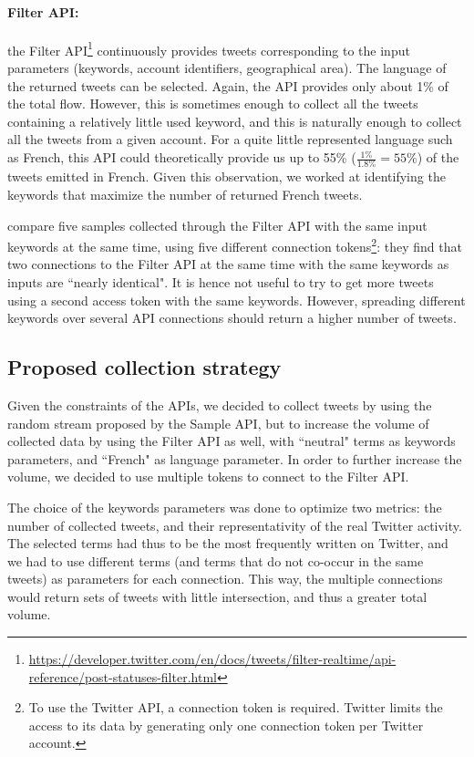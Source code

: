 \paragraph{Filter API:}

the Filter API\footnote{\url{https://developer.twitter.com/en/docs/tweets/filter-realtime/api-reference/post-statuses-filter.html}} continuously provides tweets corresponding to the input parameters (keywords, account identifiers, geographical area). The language of the returned tweets can be selected. Again, the API provides only about 1\% of the total flow. However, this is sometimes enough to collect all the tweets containing a relatively little used keyword, and this is naturally enough to collect all the tweets from a given account. For a quite little represented language such as French, this API could theoretically provide us up to 55\% ($\frac{1\%}{1.8\%} = 55\%$) of the tweets emitted in French. Given this observation, we worked at identifying the keywords that maximize the number of returned French tweets.


\citet{joseph_two_2014} compare five samples collected through the Filter API with the same input keywords at the same time, using five different connection tokens\footnote{To use the Twitter API, a connection token is required. Twitter limits the access to its data by generating only one connection token per Twitter account.}: they find that two connections to the Filter API at the same time with the same keywords as inputs are ``nearly identical". It is hence not useful to try to get more tweets using a second access token with the same keywords. However, spreading different keywords over several API connections should return a higher number of tweets.

			\subsection{Proposed collection strategy \label{Subsec: collection strategy}}

Given the constraints of the APIs, we decided to collect tweets by using the random stream proposed by the Sample API, but to increase the volume of collected data by using the Filter API as well, with ``neutral" terms as keywords parameters, and ``French" as language parameter.  In order to further increase the volume, we decided to use multiple tokens to connect to the Filter API. 



The choice of the keywords parameters was done to optimize two metrics: the number of collected tweets, and their representativity of the real Twitter activity. The selected terms had thus to be the most frequently written on Twitter, and we had to use different terms (and terms that do not co-occur in the same tweets) as parameters for each connection. This way, the multiple connections would return sets of tweets with little intersection, and thus a greater total volume.


